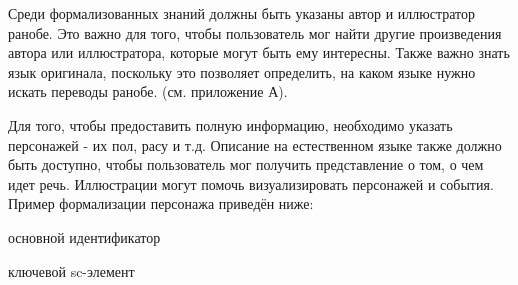 Среди формализованных знаний должны быть указаны автор и иллюстратор ранобе. Это важно для того, чтобы пользователь мог найти другие произведения автора или иллюстратора, которые могут быть ему интересны. Также важно знать язык оригинала, поскольку это позволяет определить, на каком языке нужно искать переводы ранобе. (см. приложение А).

Для того, чтобы предоставить полную информацию, необходимо указать персонажей - их пол, расу и т.д. Описание на естественном языке также должно быть доступно, чтобы пользователь мог получить представление о том, о чем идет речь. Иллюстрации могут помочь визуализировать персонажей и события. Пример формализации персонажа приведён ниже:

\begin{SCn}
    \begin{scnrelfromlist}{основной идентификатор}
        \begin{scnindent}
        \end{scnindent}
        \begin{scnindent}
        \end{scnindent}
    \end{scnrelfromlist}
    \begin{scniselementrolelist}{ключевой sc-элемент}
    \end{scniselementrolelist}
    \begin{scnindent}
    \end{scnindent}
\end{SCn}

